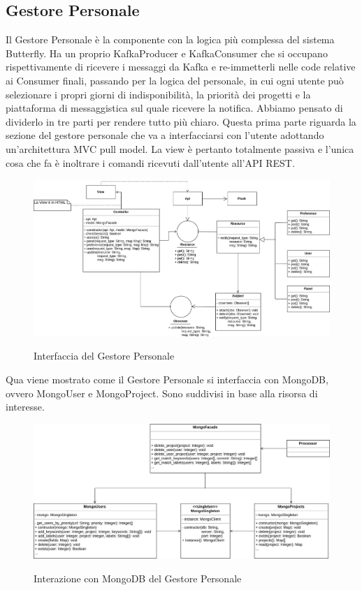 \subsection{Gestore Personale}
Il Gestore Personale è la componente con la logica più complessa del sistema Butterfly. Ha un proprio KafkaProducer e KafkaConsumer
che si occupano rispettivamente di ricevere i messaggi da Kafka e re-immetterli nelle code relative ai Consumer finali, passando per la logica
del personale, in cui ogni utente può selezionare i propri giorni di indisponibilità, la priorità dei progetti e la piattaforma di messaggistica sul
quale ricevere la notifica. Abbiamo pensato di dividerlo in tre parti per rendere tutto più chiaro.\newline
Questa prima parte riguarda la sezione del gestore personale che va a interfacciarsi con l’utente adottando un’architettura MVC pull model.
La view è pertanto totalmente passiva e l’unica cosa che fa è inoltrare i comandi ricevuti dall’utente all’API REST.

\begin{figure}[H]
    \centering
    \includegraphics[width=\textwidth]{img/GP-Processor.png}\\
    \caption{Interfaccia del Gestore Personale}
    \label{fig:GP-Processor}
\end{figure}

Qua viene mostrato come il Gestore Personale si interfaccia con MongoDB, ovvero MongoUser e MongoProject. Sono suddivisi in base alla risorsa di interesse.

\begin{figure}[H]
    \centering
    \includegraphics[width=\textwidth]{img/GP-Mongo.png}\\
    \caption{Interazione con MongoDB del Gestore Personale}
    \label{fig:GP-Mongo}
\end{figure}


